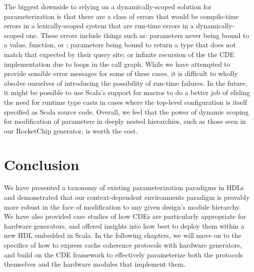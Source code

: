 The biggest downside to relying on a dynamically-scoped solution for parameterization is that there
are a class of errors that would be compile-time errors in a lexically-scoped system that are
run-time errors in a dynamically-scoped one.
These errors include things such as:
parameters never being bound to a value, function, or ;
parameters being bound to return a type that does not match that expected by their query site;
or infinite recursion of the the CDE implementation due to loops in the  call graph.
While we have attempted to provide sensible error messages for some of these cases,
it is difficult to wholly absolve ourselves of introducing the possibility of run-time failures.
In the future, it might be possible to use Scala's support for macros to do a better job of eliding the need for runtime type casts
in cases where the top-level configuration is itself specified as Scala source code.
Overall, we feel that the power of dynamic scoping for modification of parameters in deeply nested hierarchies,
such as those seen in our RocketChip generator, is worth the cost.

\section{Conclusion}
\label{sec:con}

We have presented a taxonomy of existing parameterization paradigms in HDLs and demonstrated that our 
context-dependent environments paradigm is provably more robust in the face of modification to any given design's module hierarchy. 
We have also provided case studies of how CDEs are particularly appropriate for hardware generators,
and offered insights into how best to deploy them within a new HDL embedded in Scala.
In the following chapters, we will move on to the specifics of how to express cache coherence protocols with hardware generators,
and build on the CDE framework to effectively parameterize both the protocols themselves and the hardware modules that implement them.
